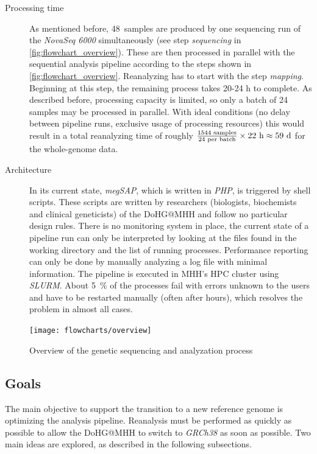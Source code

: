 \begin{description}
    \item[Processing time] As mentioned before, \SI{48}{samples} are produced by one sequencing run of the \textit{NovaSeq 6000} simultaneously (see step \textit{sequencing} in \autoref{fig:flowchart_overview}). These are then processed in parallel with the sequential analysis pipeline according to the steps shown in \autoref{fig:flowchart_overview}. Reanalyzing has to start with the step \textit{mapping}. Beginning at this step, the remaining process takes 20-24 \unit{\hour} to complete. As described before, processing capacity is limited, so only a batch of 24 samples may be processed in parallel. With ideal conditions (no delay between pipeline runs, exclusive usage of processing resources) this would result in a total reanalyzing time of roughly \(\frac{1544\text{ samples}}{24\text{ per batch}}\times22\text{ \unit{\hour}}\approx59\text{ \unit{\day}}\) for the whole-genome data.
    
    \item[Architecture] In its current state, \textit{\ac{megSAP}}, which is written in \textit{PHP}, is triggered by shell scripts. These scripts are written by researchers (biologists, biochemists and clinical geneticists) of the \ac{DoHG@MHH} and follow no particular design rules. There is no monitoring system in place, the current state of a pipeline run can only be interpreted by looking at the files found in the working directory and the list of running processes. Performance reporting can only be done by manually analyzing a log file with minimal information. The pipeline is executed in \ac{MHH}'s \ac{HPC} cluster using \textit{\ac{SLURM}}. About \SI{5}{\percent} of the processes fail with errors unknown to the users and have to be restarted manually (often after hours), which resolves the problem in almost all cases.
\end{description}

\begin{figure}[H]
    \centering
	\texttt{[image: flowcharts/overview]}
	\caption[Overview of the genetic sequencing and analyzation process]{Overview of the genetic sequencing and analyzation process}
	\label{fig:flowchart_overview}
\end{figure}

\subsection{Goals}\label{subsection:goals}
The main objective to support the transition to a new reference genome is optimizing the analysis pipeline. Reanalysis must be performed as quickly as possible to allow the \ac{DoHG@MHH} to switch to \textit{GRCh38} as soon as possible. Two main ideas are explored, as described in the following subsections.


